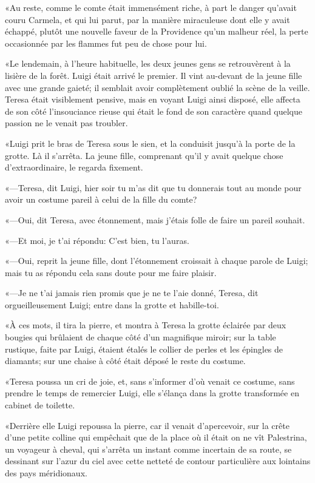 «Au reste, comme le comte était immensément riche, à part le danger qu'avait couru Carmela, et qui lui parut, par la manière miraculeuse dont elle y avait échappé, plutôt une nouvelle faveur de la Providence qu'un malheur réel, la perte occasionnée par les flammes fut peu de chose pour lui. 

«Le lendemain, à l'heure habituelle, les deux jeunes gens se retrouvèrent à la lisière de la forêt. Luigi était arrivé le premier. Il vint au-devant de la jeune fille avec une grande gaieté; il semblait avoir complètement oublié la scène de la veille. Teresa était visiblement pensive, mais en voyant Luigi ainsi disposé, elle affecta de son côté l'insouciance rieuse qui était le fond de son caractère quand quelque passion ne le venait pas troubler. 

«Luigi prit le bras de Teresa sous le sien, et la conduisit jusqu'à la porte de la grotte. Là il s'arrêta. La jeune fille, comprenant qu'il y avait quelque chose d'extraordinaire, le regarda fixement. 

«—Teresa, dit Luigi, hier soir tu m'as dit que tu donnerais tout au monde pour avoir un costume pareil à celui de la fille du comte? 

«—Oui, dit Teresa, avec étonnement, mais j'étais folle de faire un pareil souhait. 

«—Et moi, je t'ai répondu: C'est bien, tu l'auras. 

«—Oui, reprit la jeune fille, dont l'étonnement croissait à chaque parole de Luigi; mais tu as répondu cela sans doute pour me faire plaisir. 

«—Je ne t'ai jamais rien promis que je ne te l'aie donné, Teresa, dit orgueilleusement Luigi; entre dans la grotte et habille-toi. 

«À ces mots, il tira la pierre, et montra à Teresa la grotte éclairée par deux bougies qui brûlaient de chaque côté d'un magnifique miroir; sur la table rustique, faite par Luigi, étaient étalés le collier de perles et les épingles de diamants; sur une chaise à côté était déposé le reste du costume.  

«Teresa poussa un cri de joie, et, sans s'informer d'où venait ce costume, sans prendre le temps de remercier Luigi, elle s'élança dans la grotte transformée en cabinet de toilette. 

«Derrière elle Luigi repoussa la pierre, car il venait d'apercevoir, sur la crête d'une petite colline qui empêchait que de la place où il était on ne vît Palestrina, un voyageur à cheval, qui s'arrêta un instant comme incertain de sa route, se dessinant sur l'azur du ciel avec cette netteté de contour particulière aux lointains des pays méridionaux. 

